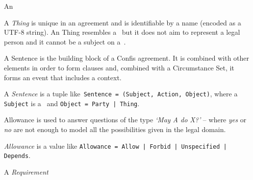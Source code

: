 \begin{definition}[Action]
    \label{def:action}
    An
\end{definition}

\begin{definition}[Thing]
    \label{def:thing}
    A \emph{Thing} is unique in an agreement and is identifiable by a name (encoded as a UTF-8 string).
    An Thing resembles a~ but it does not aim to represent a legal person and it cannot be a subject on a~.
\end{definition}

A Sentence is the building block of a Confis agreement.
It is combined with other elements in order to form clauses and, combined with a Circumstance Set, it forms an event that includes a context.

\begin{definition}[Sentence]
    \label{def:sentence}
    A \emph{Sentence} is a tuple like~\texttt{Sentence = (Subject, Action, Object)}, where a \texttt{Subject} is a~ and \texttt{Object = Party | Thing}.
\end{definition}

Allowance is used to answer questions of the type \emph{`May A do X?'} -- where \emph{yes} or \emph{no} are not enough to model all the possibilities given in the legal domain.


\begin{definition}[Allowance]
    \emph{Allowance} is a value like \texttt{Allowance = Allow | Forbid | Unspecified | Depends}.
\end{definition}

\begin{definition}[Capability]
    \label{def:capability}
\end{definition}


\begin{definition}[Requirement]
    \label{def:requirement} A \emph{Requirement}
\end{definition}

\begin{definition}[Allowance]
    \label{def:allowance}
\end{definition}

\begin{definition}
    \label{def:circumstanceSet}
\end{definition}

\begin{definition}[Compliance]
    \label{def:confis-compliance}
\end{definition}


